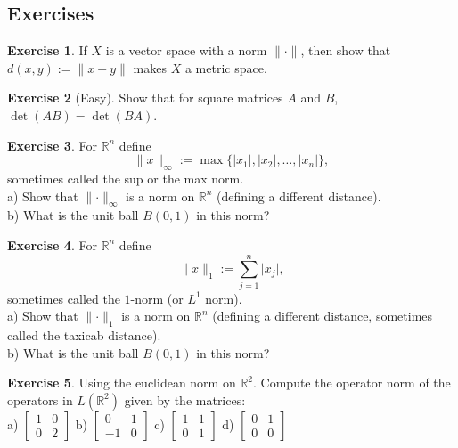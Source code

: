 \documentclass[12pt]{book}
\newcommand{\sabs}[1]{\lvert {#1} \rvert}
\newcommand{\snorm}[1]{\lVert {#1} \rVert}
\newcommand{\abs}[1]{\left\lvert {#1} \right\rvert}
\newcommand{\R}{{\mathbb{R}}}
\theoremstyle{plain}
\theoremstyle{remark}
\theoremstyle{definition}
\theoremstyle{exercise}
\newtheorem{exercise}{Exercise}[section]
\theoremstyle{example}
\begin{document}
\subsection{Exercises}

\begin{exercise}
If $X$ is a vector space with a norm $\snorm{\cdot}$, then show that
$d(x,y) := \snorm{x-y}$ makes $X$ a metric space.
\end{exercise}

\begin{exercise}[Easy]
Show that for square matrices $A$ and $B$, $\det(AB) = \det(BA)$.
\end{exercise}

\begin{exercise}
For $\R^n$ define
\begin{equation*}
\snorm{x}_{\infty} := \max \{ \abs{x_1}, \abs{x_2}, \ldots, \abs{x_n} \} ,
\end{equation*}
sometimes called the sup or the max norm.\\
a) Show that $\snorm{\cdot}_\infty$ is a norm on $\R^n$ (defining a different
distance).\\
b) What is the unit ball $B(0,1)$ in this norm?
\end{exercise}

\begin{exercise}
For $\R^n$ define
\begin{equation*}
\snorm{x}_{1} := \sum_{j=1}^n \sabs{x_j},
\end{equation*}
sometimes called the $1$-norm (or $L^1$ norm).\\
a) Show that $\snorm{\cdot}_1$ is a norm on $\R^n$ (defining a different
distance, sometimes called the taxicab distance).\\
b) What is the unit ball $B(0,1)$ in this norm?
\end{exercise}

\begin{exercise}
Using the euclidean norm on $\R^2$.  Compute the operator norm of the
operators in $L(\R^2)$ given by the matrices:
\\
a)
$\left[
\begin{smallmatrix}
1 & 0 \\
0 & 2
\end{smallmatrix}
\right]$
\quad
b)
$\left[
\begin{smallmatrix}
0 & 1 \\
-1 & 0
\end{smallmatrix}
\right]$
\quad
c)
$\left[
\begin{smallmatrix}
1 & 1 \\
0 & 1
\end{smallmatrix}
\right]$
\quad
d)
$\left[
\begin{smallmatrix}
0 & 1 \\
0 & 0
\end{smallmatrix}
\right]$
\end{exercise}
\end{document}
